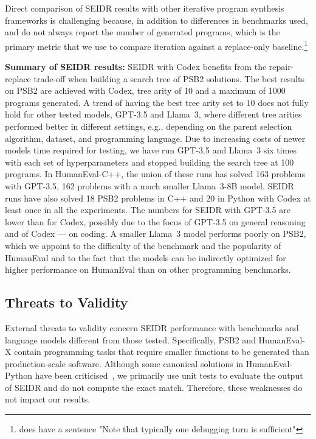 Direct comparison of SEIDR results with other iterative program synthesis frameworks is challenging because, in addition to differences in benchmarks used, \cite{jiangSelfEvolveCodeEvolution2023} and \cite{chenTeachingLargeLanguage2023} do not always report the number of generated programs, which is the primary metric that we use to compare iteration against a replace-only baseline.\footnote{\cite{chenTeachingLargeLanguage2023} does have a sentence "Note that typically one debugging turn is sufficient"}


\begin{highlight}
\textbf{Summary of SEIDR results:} 
SEIDR with Codex benefits from the repair-replace trade-off when building a search tree of PSB2 solutions. The best results on PSB2 are achieved with Codex, tree arity of 10 and a maximum of 1000 programs generated. A trend of having the best tree arity set to 10 does not fully hold for other tested models, GPT-3.5 and Llama~3, where different tree arities performed better in different settings, e.g., depending on the parent selection algorithm, dataset, and programming language. 
Due to increasing costs of newer models time required for testing, we have run GPT-3.5 and Llama~3 six times with each set of hyperparameters and stopped building the search tree at 100 programs. 
In HumanEval-C++, the union of these runs has solved 163 problems with GPT-3.5, 162 problems with a much smaller Llama~3-8B model.
SEIDR runs have also solved 18 PSB2 problems in C++ and 20 in Python with Codex at least once in all the experiments. 
The numbers for SEIDR with GPT-3.5 are lower than for Codex, possibly due to the focus of GPT-3.5 on general reasoning and of Codex --- on coding.
A smaller Llama~3 model performs poorly on PSB2, which we appoint to the difficulty of the benchmark and the popularity of HumanEval and to the fact that the models can be indirectly optimized for higher performance on HumanEval than on other programming benchmarks.
\end{highlight}


\newpage\subsection{Threats to Validity}
\label{sec:seidr-threats}

External threats to validity concern SEIDR performance with benchmarks and language models different from those tested. 
Specifically, PSB2 and HumanEval-X contain programming tasks that require smaller functions to be generated than production-scale software.
Although some canonical solutions in HumanEval-Python have been criticised~\cite{liuYourCodeGenerated2023}, we primarily use unit tests to evaluate the output of SEIDR and do not compute the exact match. Therefore, these weaknesses do not impact our results.

